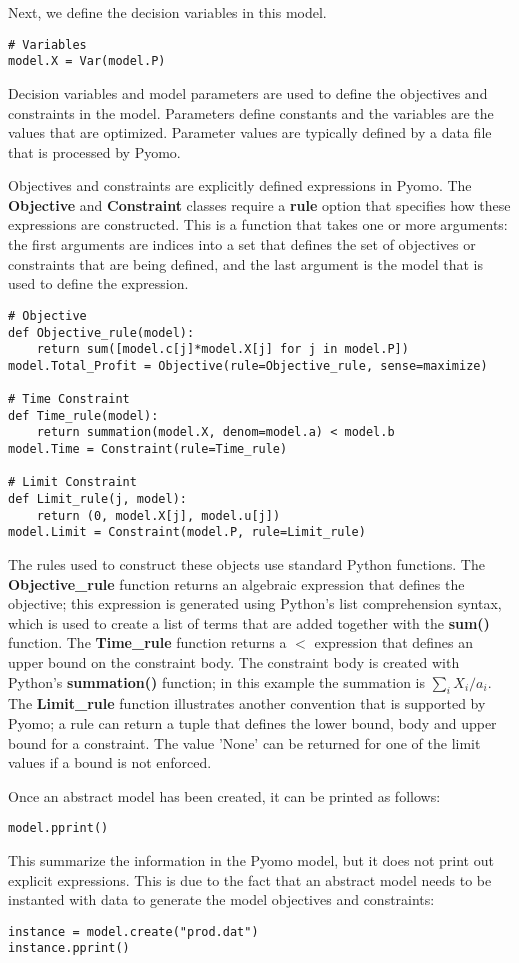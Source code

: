 Next, we define the decision variables in this model.
\begin{lstlisting}
# Variables
model.X = Var(model.P)
\end{lstlisting}
Decision variables and model parameters are used to define the objectives and constraints in the model.  Parameters define constants and the variables are the values that are optimized.  Parameter values are typically defined by a data file that is processed by Pyomo.

Objectives and constraints are explicitly defined expressions in Pyomo.  The {\bf Objective} and {\bf Constraint} classes require a {\bf rule} option that specifies how these expressions are constructed.  This is a function that takes one or more arguments:  the first arguments are indices into a set that defines the set of objectives or constraints that are being defined, and the last argument is the model that is used to define the expression.
\begin{lstlisting}
# Objective
def Objective_rule(model):
    return sum([model.c[j]*model.X[j] for j in model.P])
model.Total_Profit = Objective(rule=Objective_rule, sense=maximize)

# Time Constraint
def Time_rule(model):
    return summation(model.X, denom=model.a) < model.b
model.Time = Constraint(rule=Time_rule)

# Limit Constraint
def Limit_rule(j, model):
    return (0, model.X[j], model.u[j])
model.Limit = Constraint(model.P, rule=Limit_rule)
\end{lstlisting}
The rules used to construct these objects use standard Python functions. The {\bf Objective\_rule} function returns an algebraic expression that defines the objective;  this expression is generated using Python's list comprehension syntax, which is used to create a list of terms that are added together with the {\bf sum()} function.  The {\bf Time\_rule} function returns a $<$ expression that  defines an upper bound on the constraint body.  The constraint body is created with Python's {\bf summation()} function; in this example the summation is $\sum_i X_i/a_i$.  The {\bf Limit\_rule} function illustrates another convention that is supported by Pyomo; a rule can return a tuple that defines the lower bound, body and upper bound for a constraint.  The value 'None' can be returned for one of the limit values if a bound is not enforced.

Once an abstract model has been created, it can be printed as follows:
\begin{lstlisting}
model.pprint()
\end{lstlisting}
This summarize the information in the Pyomo model, but it does not print out explicit expressions.  This is due to the fact that an abstract model needs to be instanted with data to generate the model objectives and constraints:
\begin{lstlisting}
instance = model.create("prod.dat")
instance.pprint()
\end{lstlisting}


